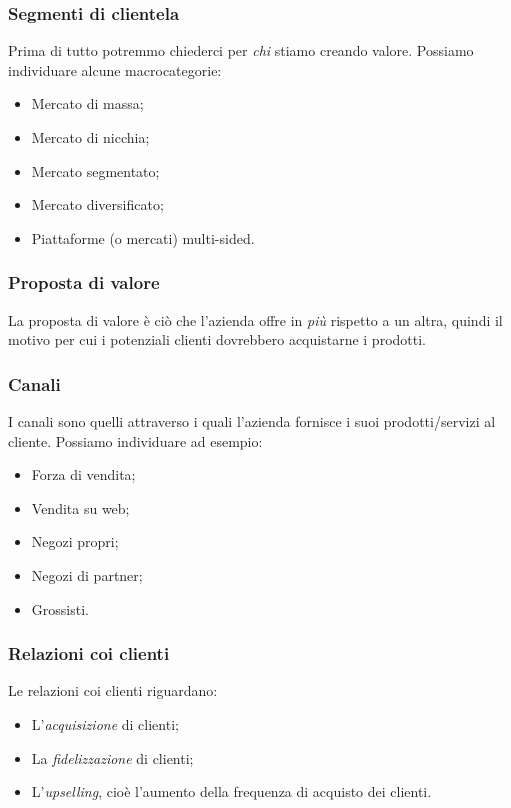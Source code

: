 \documentclass[a4paper,11pt]{article}
\begin{document}
\subsubsection{Segmenti di clientela}
Prima di tutto potremmo chiederci per \textit{chi} stiamo creando valore.
Possiamo individuare alcune macrocategorie:
\begin{itemize}
	\item Mercato di massa;
	\item Mercato di nicchia;
	\item Mercato segmentato;
	\item Mercato diversificato;
	\item Piattaforme (o mercati) multi-sided.
\end{itemize}

\subsubsection{Proposta di valore}
La proposta di valore è ciò che l'azienda offre in \textit{più} rispetto a un altra, quindi il motivo per cui i potenziali clienti dovrebbero acquistarne i prodotti.

\subsubsection{Canali}
I canali sono quelli attraverso i quali l'azienda fornisce i suoi prodotti/servizi al cliente.
Possiamo individuare ad esempio:
\begin{itemize}
	\item Forza di vendita;
	\item Vendita su web;
	\item Negozi propri;
	\item Negozi di partner;
	\item Grossisti.
\end{itemize}

\subsubsection{Relazioni coi clienti}
Le relazioni coi clienti riguardano:
\begin{itemize}
	\item L'\textit{acquisizione} di clienti;
	\item La \textit{fidelizzazione} di clienti;
	\item L'\textit{upselling}, cioè l'aumento della frequenza di acquisto dei clienti.
\end{itemize}
\end{document}
